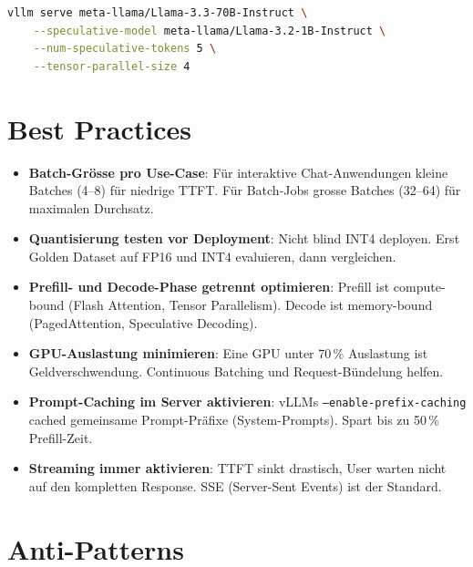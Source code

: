 \begin{lstlisting}[language=bash, caption=Speculative Decoding in vLLM]
vllm serve meta-llama/Llama-3.3-70B-Instruct \
    --speculative-model meta-llama/Llama-3.2-1B-Instruct \
    --num-speculative-tokens 5 \
    --tensor-parallel-size 4
\end{lstlisting}


\section{Best Practices}

\begin{itemize}[leftmargin=*]
    \item \textbf{Batch-Grösse pro Use-Case}: Für interaktive Chat-Anwendungen kleine Batches (4--8) für niedrige TTFT. Für Batch-Jobs grosse Batches (32--64) für maximalen Durchsatz.
    \item \textbf{Quantisierung testen vor Deployment}: Nicht blind INT4 deployen. Erst Golden Dataset auf FP16 und INT4 evaluieren, dann vergleichen.
    \item \textbf{Prefill- und Decode-Phase getrennt optimieren}: Prefill ist compute-bound (Flash Attention, Tensor Parallelism). Decode ist memory-bound (PagedAttention, Speculative Decoding).
    \item \textbf{GPU-Auslastung minimieren}: Eine GPU unter 70\,\% Auslastung ist Geldverschwendung. Continuous Batching und Request-Bündelung helfen.
    \item \textbf{Prompt-Caching im Server aktivieren}: vLLMs \texttt{--enable-prefix-caching} cached gemeinsame Prompt-Präfixe (System-Prompts). Spart bis zu 50\,\% Prefill-Zeit.
    \item \textbf{Streaming immer aktivieren}: TTFT sinkt drastisch, User warten nicht auf den kompletten Response. SSE (Server-Sent Events) ist der Standard.
\end{itemize}

\section{Anti-Patterns}

